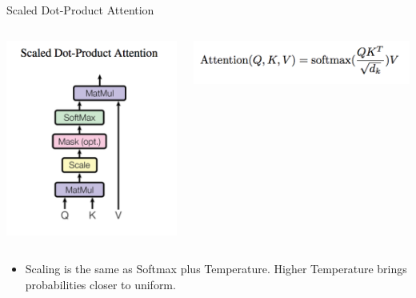 \documentclass{beamer}
\begin{document}
\begin{frame}[fragile]{Scaled Dot-Product Attention}{}
\begin{columns}[T] %
\begin{column}{.48\textwidth}
\centering
\includegraphics[width=\textwidth]{img/attn_fig.png}
\end{column}%
\hfill%
\begin{column}{.48\textwidth}
\begin{minipage}[c][.6\textheight][c]{\linewidth}
\includegraphics[width=\textwidth]{img/attn_eq.png}
\end{minipage}
\end{column}%
\end{columns}

\begin{itemize}
\item Scaling is the same as Softmax plus Temperature. Higher Temperature brings probabilities closer to uniform.
\end{itemize}
\end{frame}
%
\end{document}
